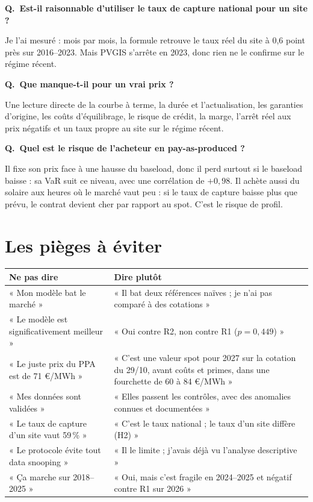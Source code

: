 \documentclass[11pt,a4paper]{article}
\newcounter{qr}
\newcommand{\qr}[2]{\stepcounter{qr}\par\medskip\noindent\textbf{Q\theqr.\ #1}\par\nopagebreak\noindent #2\par}
\begin{document}
\qr{Est-il raisonnable d'utiliser le taux de capture national pour un site ?}{Je l'ai mesuré : mois par mois, la formule retrouve le taux réel du site à 0,6 point près sur 2016--2023. Mais PVGIS s'arrête en 2023, donc rien ne le confirme sur le régime récent.}

\qr{Que manque-t-il pour un vrai prix ?}{Une lecture directe de la courbe à terme, la durée et l'actualisation, les garanties d'origine, les coûts d'équilibrage, le risque de crédit, la marge, l'arrêt réel aux prix négatifs et un taux propre au site sur le régime récent.}

\qr{Quel est le risque de l'acheteur en pay-as-produced ?}{Il fixe son prix face à une hausse du baseload, donc il perd surtout si le baseload baisse : sa VaR suit ce niveau, avec une corrélation de $+0{,}98$. Il achète aussi du solaire aux heures où le marché vaut peu : si le taux de capture baisse plus que prévu, le contrat devient cher par rapport au spot. C'est le risque de profil.}

\section{Les pièges à éviter}

\begin{center}
\begin{tabularx}{\linewidth}{YY}
\toprule
\textbf{Ne pas dire} & \textbf{Dire plutôt} \\
\midrule
« Mon modèle bat le marché » & « Il bat deux références naïves ; je n'ai pas comparé à des cotations » \\
« Le modèle est significativement meilleur » & « Oui contre R2, non contre R1 ($p = 0{,}449$) » \\
« Le juste prix du PPA est de 71 €/MWh » & « C'est une valeur spot pour 2027 sur la cotation du 29/10, avant coûts et primes, dans une fourchette de 60 à 84 €/MWh » \\
« Mes données sont validées » & « Elles passent les contrôles, avec des anomalies connues et documentées » \\
« Le taux de capture d'un site vaut 59\,\% » & « C'est le taux national ; le taux d'un site diffère (H2) » \\
« Le protocole évite tout data snooping » & « Il le limite ; j'avais déjà vu l'analyse descriptive » \\
« Ça marche sur 2018--2025 » & « Oui, mais c'est fragile en 2024--2025 et négatif contre R1 sur 2026 » \\
\bottomrule
\end{tabularx}
\end{center}
\end{document}
